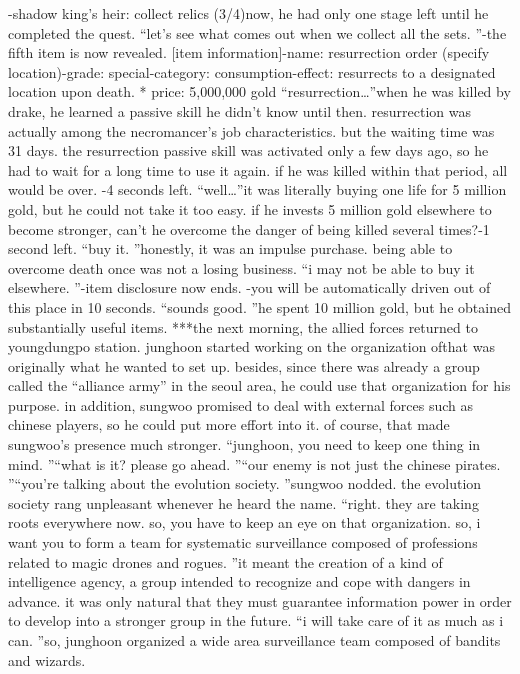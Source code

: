 -shadow king’s heir: collect relics (3/4)now, he had only one stage left until he completed the quest.
“let’s see what comes out when we collect all the sets.
”-the fifth item is now revealed.
[item information]-name: resurrection order (specify location)-grade: special-category: consumption-effect: resurrects to a designated location upon death.
* price: 5,000,000 gold
“resurrection…”when he was killed by drake, he learned a passive skill he didn’t know until then.
resurrection was actually among the necromancer’s job characteristics.
 but the waiting time was 31 days.
the resurrection passive skill was activated only a few days ago, so he had to wait for a long time to use it again.
 if he was killed within that period, all would be over.
-4 seconds left.
“well…”it was literally buying one life for 5 million gold, but he could not take it too easy.
if he invests 5 million gold elsewhere to become stronger, can’t he overcome the danger of being killed several times?-1 second left.
“buy it.
”honestly, it was an impulse purchase.
 being able to overcome death once was not a losing business.
“i may not be able to buy it elsewhere.
”-item disclosure now ends.
-you will be automatically driven out of this place in 10 seconds.
“sounds good.
”he spent 10 million gold, but he obtained substantially useful items.
***the next morning, the allied forces returned to youngdungpo station.
junghoon started working on the organization ofthat was originally what he wanted to set up.
 besides, since there was already a group called the “alliance army” in the seoul area, he could use that organization for his purpose.
in addition, sungwoo promised to deal with external forces such as chinese players, so he could put more effort into it.
 of course, that made sungwoo’s presence much stronger.
“junghoon, you need to keep one thing in mind.
”“what is it? please go ahead.
”“our enemy is not just the chinese pirates.
”“you’re talking about the evolution society.
”sungwoo nodded.
the evolution society rang unpleasant whenever he heard the name.
“right.
 they are taking roots everywhere now.
 so, you have to keep an eye on that organization.
 so, i want you to form a team for systematic surveillance composed of professions related to magic drones and rogues.
”it meant the creation of a kind of intelligence agency, a group intended to recognize and cope with dangers in advance.
it was only natural that they must guarantee information power in order to develop into a stronger group in the future.
“i will take care of it as much as i can.
”so, junghoon organized a wide area surveillance team composed of bandits and wizards.
